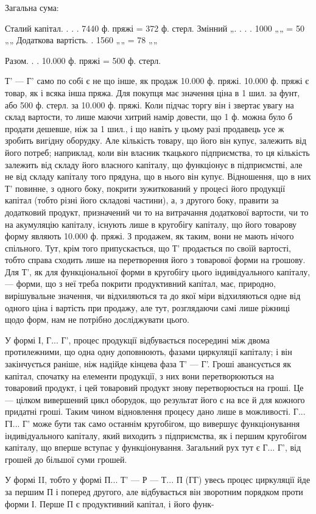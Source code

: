 Загальна сума:

Сталий капітал.  .  .  .      7440 ф. пряжі = 372 ф. стерл.
Змінний „.  .  .  .      1000 „„ = 50 „„
Додаткова вартість.  .     1560 „„ = 78 „„

                      Разом. . .    10.000 ф. пряжі = 500 ф. стерл.

Т' — Г' само по собі є не що інше, як продаж 10.000 ф. пряжі.
10.000    ф. пряжі є товар, як і всяка інша пряжа. Для покупця має значення
ціна в 1 шил. за фунт, або 500 ф. стерл. за 10.000 ф. пряжі. Коли
підчас торгу він і звертає увагу на склад вартости, то лише маючи
хитрий намір довести, що 1 ф. можна було б продати дешевше, ніж за
1 шил., і що навіть у цьому разі продавець усе ж зробить вигідну оборудку.
Але кількість товару, що його він купує, залежить від його
потреб; наприклад, коли він власник ткацького підприємства, то ця
кількість залежить від складу його власного капіталу, що функціонує в
підприємстві, але не від складу капіталу того прядуна, що в нього він
купує. Відношення, що в них Т' повинне, з одного боку, покрити
зужиткований у процесі його продукції капітал (тобто різні його складові
частини), а, з другого боку, правити за додатковий продукт, призначений
чи то на витрачання додаткової вартости, чи то на акумуляцію капіталу,
існують лише в кругобігу капіталу, що його товарову форму являють
10.000 ф. пряжі. З продажем, як таким, вони не мають нічого спільного.
Тут, крім того припускається, що Т' продається по своїй вартості, тобто
справа сходить лише на перетворення його з товарової форми на грошову.
Для Т', як для функціональної форми в кругобігу цього індивідуального
капіталу, — форми, що з неї треба покрити продуктивний капітал, має,
природно, вирішувальне значення, чи відхиляються та до якої міри відхиляються
одне від одного ціна і вартість при продажу, але тут, розглядаючи
самі лише ріжниці щодо форм, нам не потрібно досліджувати
цього.

У формі І, Г... Г', процес продукції відбувається посередині між двома
протилежними, що одна одну доповнюють, фазами циркуляції капіталу;
і він закінчується раніше, ніж надійде кінцева фаза Т' — Г'. Гроші авансується
як капітал, спочатку на елементи продукції, з них вони перетворюються
на товаровий продукт, і цей товаровий продукт знову перетворюється
на гроші. Це — цілком вивершений цикл оборудок, що результат
його є на все й для кожного придатні гроші. Таким чином відновлення
процесу дано лише в можливості. Г... ГІ... Г' може бути так само останнім
кругобігом, що вивершує функціонування індивідуального капіталу, який
виходить з підприємства, як і першим кругобігом капіталу, що вперше
вступає у функціонування. Загальний рух тут є Г... Г', від грошей до більшої
суми грошей.

У формі II, тобто у формі П... Т' — Р — Т... П (ГГ) увесь процес циркуляції
йде за першим П і поперед другого, але відбувається він зворотним
порядком проти форми І. Перше П є продуктивний капітал, і його функ-
